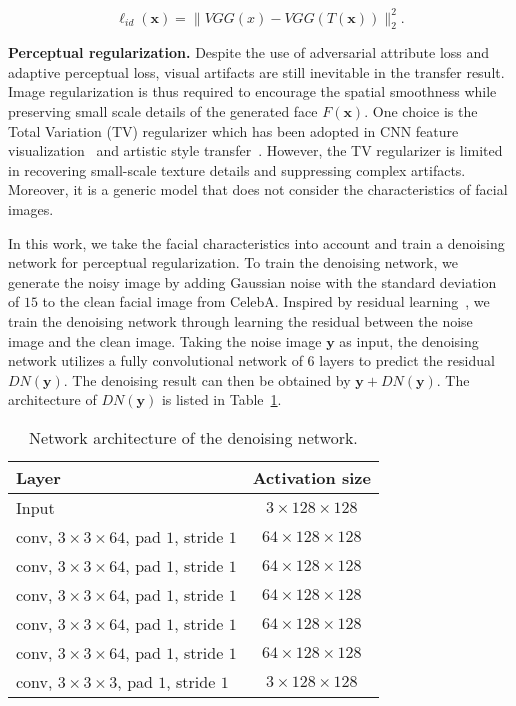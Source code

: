 \documentclass[journal]{IEEEtran}
\begin{document}
\begin{equation}\label{eq11_1}
  \ell_{id}(\mathbf{x}) = \|VGG(x)-VGG(T(\mathbf{x}))\|_2^2.
\end{equation}










\textbf{Perceptual regularization.}\quad
Despite the use of adversarial attribute loss and adaptive perceptual loss, visual artifacts are still inevitable in the transfer result.
Image regularization is thus required to encourage the spatial smoothness while preserving small scale details of the generated face $F(\mathbf{x})$.
One choice is the Total Variation (TV) regularizer which has been adopted in CNN feature visualization~\cite{mahendran2015understanding} and artistic style transfer~\cite{gatys2015style,johnson2016perceptual}.
However, the TV regularizer is limited in recovering small-scale texture details and suppressing complex artifacts.
Moreover, it is a generic model that does not consider the characteristics of facial images.



In this work, we take the facial characteristics into account and train a denoising network for perceptual regularization.
To train the denoising network, we generate the noisy image by adding Gaussian noise with the standard deviation of $15$ to the clean facial image from CelebA.
Inspired by residual learning~\cite{zhang2017beyond}, we train the denoising network through learning the residual between the noise image and the clean image.
Taking the noise image $\mathbf{y}$ as input, the denoising network utilizes a fully convolutional network of 6 layers to predict the residual $DN(\mathbf{y})$.
The denoising result can then be obtained by $\mathbf{y} + DN(\mathbf{y})$. The architecture of $DN(\mathbf{y})$ is listed in Table~\ref{table:denoising}.


\begin{table}[htb]
\footnotesize
\caption{Network architecture of the denoising network.}
\begin{center}
\begin{tabular}{l|c}
\hline
Layer&  Activation size  \\
\hline
Input& $3\times128\times128$ \\
conv, $3\times3\times64$, pad $1$,  stride $1$ & $64\times128\times128$ \\
conv, $3\times3\times64$, pad $1$,  stride $1$ & $64\times128\times128$ \\
conv, $3\times3\times64$, pad $1$,  stride $1$ & $64\times128\times128$ \\
conv, $3\times3\times64$, pad $1$,  stride $1$ & $64\times128\times128$ \\
conv, $3\times3\times64$, pad $1$,  stride $1$ & $64\times128\times128$ \\
conv, $3\times3\times3$, pad $1$,  stride $1$ & $3\times128\times128$ \\
\hline
\end{tabular}
\end{center}
\label{table:denoising}
\end{table}
\end{document}
